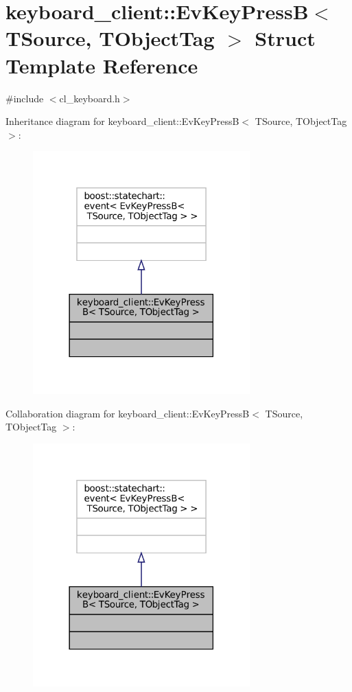 \hypertarget{structkeyboard__client_1_1EvKeyPressB}{}\section{keyboard\+\_\+client\+:\+:Ev\+Key\+PressB$<$ T\+Source, T\+Object\+Tag $>$ Struct Template Reference}
\label{structkeyboard__client_1_1EvKeyPressB}


{\ttfamily \#include $<$cl\+\_\+keyboard.\+h$>$}



Inheritance diagram for keyboard\+\_\+client\+:\+:Ev\+Key\+PressB$<$ T\+Source, T\+Object\+Tag $>$\+:
\nopagebreak
\begin{figure}[H]
\begin{center}
\leavevmode
\includegraphics[width=237pt]{structkeyboard__client_1_1EvKeyPressB__inherit__graph}
\end{center}
\end{figure}


Collaboration diagram for keyboard\+\_\+client\+:\+:Ev\+Key\+PressB$<$ T\+Source, T\+Object\+Tag $>$\+:
\nopagebreak
\begin{figure}[H]
\begin{center}
\leavevmode
\includegraphics[width=237pt]{structkeyboard__client_1_1EvKeyPressB__coll__graph}
\end{center}
\end{figure}


